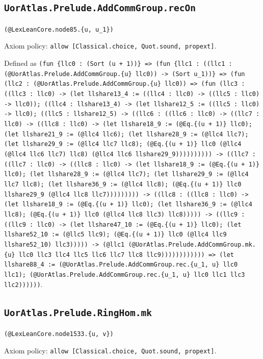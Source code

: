 \documentclass[11pt]{article}
\begin{document}
\subsection*{\texttt{UorAtlas.Prelude.AddCommGroup.recOn}}
\noindent\texttt{(@LexLeanCore.node85.\{u, u\_1\})}\par
\noindent Axiom policy: \texttt{allow [Classical.choice, Quot.sound, propext]}.\par
\noindent Defined as \texttt{(fun \{llc0 : (Sort (u + 1))\} => (fun \{llc1 : ((llc1 : (@UorAtlas.Prelude.AddCommGroup.\{u\} llc0)) -> (Sort u\_1))\} => (fun (llc2 : (@UorAtlas.Prelude.AddCommGroup.\{u\} llc0)) => (fun (llc3 : ((llc3 : llc0) -> (let llshare13\_4 := ((llc4 : llc0) -> ((llc5 : llc0) -> llc0)); ((llc4 : llshare13\_4) -> (let llshare12\_5 := ((llc5 : llc0) -> llc0); ((llc5 : llshare12\_5) -> ((llc6 : ((llc6 : llc0) -> ((llc7 : llc0) -> ((llc8 : llc0) -> (let llshare18\_9 := (@Eq.\{(u + 1)\} llc0); (let llshare21\_9 := (@llc4 llc6); (let llshare28\_9 := (@llc4 llc7); (let llshare29\_9 := (@llc4 llc7 llc8); (@Eq.\{(u + 1)\} llc0 (@llc4 (@llc4 llc6 llc7) llc8) (@llc4 llc6 llshare29\_9)))))))))) -> ((llc7 : ((llc7 : llc0) -> ((llc8 : llc0) -> (let llshare18\_9 := (@Eq.\{(u + 1)\} llc0); (let llshare28\_9 := (@llc4 llc7); (let llshare29\_9 := (@llc4 llc7 llc8); (let llshare36\_9 := (@llc4 llc8); (@Eq.\{(u + 1)\} llc0 llshare29\_9 (@llc4 llc8 llc7))))))))) -> ((llc8 : ((llc8 : llc0) -> (let llshare18\_9 := (@Eq.\{(u + 1)\} llc0); (let llshare36\_9 := (@llc4 llc8); (@Eq.\{(u + 1)\} llc0 (@llc4 llc8 llc3) llc8))))) -> ((llc9 : ((llc9 : llc0) -> (let llshare47\_10 := (@Eq.\{(u + 1)\} llc0); (let llshare52\_10 := (@llc5 llc9); (@Eq.\{(u + 1)\} llc0 (@llc4 llc9 llshare52\_10) llc3))))) -> (@llc1 (@UorAtlas.Prelude.AddCommGroup.mk.\{u\} llc0 llc3 llc4 llc5 llc6 llc7 llc8 llc9)))))))))))) => (let llshare88\_4 := (@UorAtlas.Prelude.AddCommGroup.rec.\{u\_1, u\} llc0 llc1); (@UorAtlas.Prelude.AddCommGroup.rec.\{u\_1, u\} llc0 llc1 llc3 llc2))))))}.\par
\subsection*{\texttt{UorAtlas.Prelude.RingHom.mk}}
\noindent\texttt{(@LexLeanCore.node1533.\{u, v\})}\par
\noindent Axiom policy: \texttt{allow [Classical.choice, Quot.sound, propext]}.\par
\end{document}
